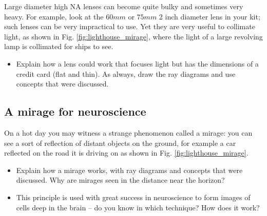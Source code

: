 \documentclass[a4paper]{report}
\begin{document}
	Large diameter high NA lenses can become quite bulky and sometimes very heavy.
	For example, look at the $60mm$ or $75mm$ 2 inch diameter lens in your kit; such lenses can be very impractical to use.
	Yet they are very useful to collimate light, as shown in Fig. \ref{fig:lighthouse_mirage}, where the light of a large revolving lamp is collimated for ships to see.

	\begin{itemize}
	    \item Explain how a lens could work that focuses light but has the dimensions of a credit card (flat and thin). As always, draw the ray diagrams and use concepts that were discussed.
	\end{itemize}




    \subsection{A mirage for neuroscience}
	\hypertarget{hintBack-mirage}{}

	On a hot day you may witness a strange phenomenon called a mirage: you can see a sort of reflection of distant objects on the ground, for example a car reflected on the road it is driving on as shown in Fig. \ref{fig:lighthouse_mirage}.

	\begin{itemize}
	    \item Explain how a mirage works, with ray diagrams and concepts that were discussed. Why are mirages seen in the distance near the horizon?
	    \item This principle is used with great success in neuroscience to form images of cells deep in the brain -- do you know in which technique? How does it work?
	\end{itemize}
\end{document}
